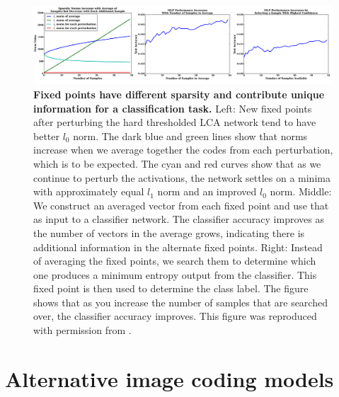 \begin{figure}[h]\label{fig:ch2_lca_norms_and_acc}
    \centering
    \includegraphics[width=\textwidth]{figures/lca_norms_acc.png}
    \caption{\textbf{Fixed points have different sparsity and contribute unique information for a classification task.} Left: New fixed points after perturbing the hard thresholded LCA network tend to have better $l_{0}$ norm. The dark blue and green lines show that norms increase when we average together the codes from each perturbation, which is to be expected. The cyan and red curves show that as we continue to perturb the activations, the network settles on a minima with approximately equal $l_{1}$ norm and an improved $l_{0}$ norm. Middle: We construct an averaged vector from each fixed point and use that as input to a classifier network. The classifier accuracy improves as the number of vectors in the average grows, indicating there is additional information in the alternate fixed points. Right: Instead of averaging the fixed points, we search them to determine which one produces a minimum entropy output from the classifier. This fixed point is then used to determine the class label. The figure shows that as you increase the number of samples that are searched over, the classifier accuracy improves. This figure was reproduced with permission from \parencite{shainin2016sampling}.}
\end{figure}


\section{Alternative image coding models}\label{sec:ch2_alternative_image_coding_models}

%
%



